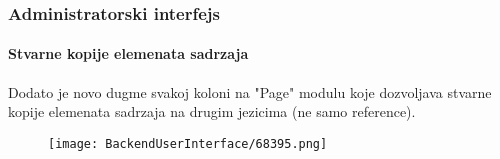 \begin{frame}[fragile]
	\frametitle{Administratorski interfejs}
	\framesubtitle{Stvarne kopije elemenata sadrzaja}

	Dodato je novo dugme svakoj koloni na "Page" modulu koje dozvoljava stvarne kopije elemenata sadrzaja na drugim jezicima (ne samo reference).

	\begin{figure}
		\texttt{[image: BackendUserInterface/68395.png]}
	\end{figure}

\end{frame}


